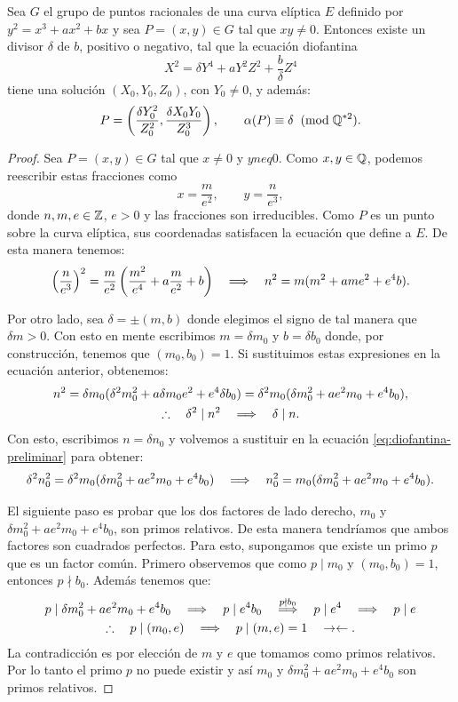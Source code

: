 \documentclass[../../tesis_maestria]{subfiles}
\begin{document}
\begin{lema}\label{lema:imagen-alpha}
	Sea $G$ el grupo de puntos racionales de una curva elíptica $E$ definido por $y^2=x^3+ax^2+bx$ y sea $P=(x,y)\in G$ tal que $xy\neq0$. Entonces existe un divisor $\delta$ de $b$, positivo o negativo, tal que la ecuación diofantina
	\[
		X^2=\delta Y^4+aY^2Z^2+\frac{b}{\delta}Z^4
	\]
	tiene una solución $(X_0,Y_0,Z_0)$, con $Y_0\neq0$, y además:
	\[
		P=\left(\frac{\delta Y_0^2}{Z_0^2},\frac{\delta X_0 Y_0}{Z_0^3} \right),\qquad \alpha(P)\equiv\delta\;\;(\mathrm{mod}\; \mathbb{Q}^{*2}).
	\]
\end{lema}
\begin{proof}
	Sea $P=(x,y)\in G$ tal que $x\neq0$ y $yneq0$. Como $x,y\in\mathbb{Q}$, podemos reescribir estas fracciones como
	\[
		x=\frac{m}{e^2},\qquad y=\frac{n}{e^3},
	\]
	donde $n,m,e\in\mathbb{Z}$, $e>0$ y las fracciones son irreducibles. Como $P$ es un punto sobre la curva elíptica, sus coordenadas satisfacen la ecuación que define a $E$. De esta manera tenemos:
	\[
		\left( \frac{n}{e^3} \right)^2=\frac{m}{e^2}\left(\frac{m^2}{e^4}+a\frac{m}{e^2}+b\right) \quad\Longrightarrow\quad n^2=m(m^2+ame^2+e^4b).
	\]
	
	Por otro lado, sea $\delta=\pm(m,b)$ donde elegimos el signo de tal manera que $\delta m>0$. Con esto en mente escribimos $m=\delta m_0$ y $b=\delta b_0$ donde, por construcción, tenemos que $(m_0,b_0)=1$. Si sustituimos estas expresiones en la ecuación anterior, obtenemos:
	\begin{gather}
		n^2=\delta m_0(\delta^2m_0^2+a\delta m_0 e^2+e^4\delta b_0)=\delta^2m_0(\delta m_0^2+ae^2m_0+e^4b_0),\label{eq:diofantina-preliminar}\\
		\therefore\quad\delta^2\mid n^2\quad\Longrightarrow\quad \delta\mid n.\nonumber
	\end{gather}
Con esto, escribimos $n=\delta n_0$ y volvemos a sustituir en la ecuación \eqref{eq:diofantina-preliminar} para obtener:
	\begin{equation}\label{eq:diofantina-preliminar-2}
		\delta^2n_0^2=\delta^2m_0(\delta m_0^2+ae^2m_0+e^4b_0) \quad\Longrightarrow\quad n_0^2=m_0(\delta m_0^2+ae^2m_0+e^4b_0).
	\end{equation}
		
	El siguiente paso es probar que los dos factores de lado derecho, $m_0$ y $\delta m_0^2+ae^2m_0+e^4b_0$, son primos relativos. De esta manera tendríamos que ambos factores son cuadrados perfectos. Para esto, supongamos que existe un primo $p$ que es un factor común. Primero observemos que como $p\mid m_0$ y $(m_0,b_0)=1$, entonces $p\nmid b_0$. Además tenemos que:
	\begin{gather*}
		p\mid \delta m_0^2+ae^2m_0+e^4b_0 \quad\Longrightarrow\quad p\mid e^4b_0 \quad\overset{p\nmid b_0}{\Longrightarrow}\quad p\mid e^4 \quad\Longrightarrow\quad p\mid e\\
		\therefore\quad p\mid(m_0,e) \quad\Longrightarrow\quad p\mid (m,e)=1 \quad\rightarrow\leftarrow.
	\end{gather*}
La contradicción es por elección de $m$ y $e$ que tomamos como primos relativos. Por lo tanto el primo $p$ no puede existir y así $m_0$ y $\delta m_0^2+ae^2m_0+e^4b_0$ son primos relativos.


\end{proof}
\end{document}
